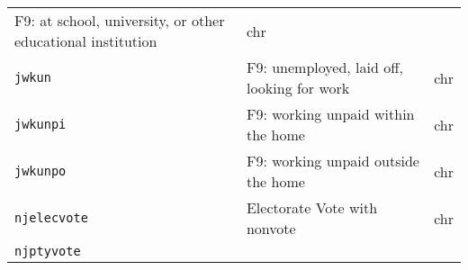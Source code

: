 \documentclass[]{article}
\begin{document}
\begin{longtable}[]{@{}lll@{}}
\begin{minipage}[t]{0.70\columnwidth}
F9: at school, university, or other educational institution\strut
\end{minipage} & \begin{minipage}[t]{0.08\columnwidth}\raggedright\strut
chr\strut
\end{minipage}\tabularnewline
\begin{minipage}[t]{0.14\columnwidth}\raggedright\strut
\texttt{jwkun}\strut
\end{minipage} & \begin{minipage}[t]{0.70\columnwidth}\raggedright\strut
F9: unemployed, laid off, looking for work\strut
\end{minipage} & \begin{minipage}[t]{0.08\columnwidth}\raggedright\strut
chr\strut
\end{minipage}\tabularnewline
\begin{minipage}[t]{0.14\columnwidth}\raggedright\strut
\texttt{jwkunpi}\strut
\end{minipage} & \begin{minipage}[t]{0.70\columnwidth}\raggedright\strut
F9: working unpaid within the home\strut
\end{minipage} & \begin{minipage}[t]{0.08\columnwidth}\raggedright\strut
chr\strut
\end{minipage}\tabularnewline
\begin{minipage}[t]{0.14\columnwidth}\raggedright\strut
\texttt{jwkunpo}\strut
\end{minipage} & \begin{minipage}[t]{0.70\columnwidth}\raggedright\strut
F9: working unpaid outside the home\strut
\end{minipage} & \begin{minipage}[t]{0.08\columnwidth}\raggedright\strut
chr\strut
\end{minipage}\tabularnewline
\begin{minipage}[t]{0.14\columnwidth}\raggedright\strut
\texttt{njelecvote}\strut
\end{minipage} & \begin{minipage}[t]{0.70\columnwidth}\raggedright\strut
Electorate Vote with nonvote\strut
\end{minipage} & \begin{minipage}[t]{0.08\columnwidth}\raggedright\strut
chr\strut
\end{minipage}\tabularnewline
\begin{minipage}[t]{0.14\columnwidth}\raggedright\strut
\texttt{njptyvote}\strut

\end{minipage}
\end{longtable}
\end{document}
